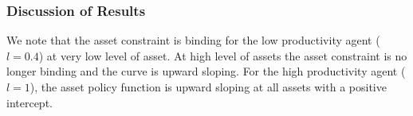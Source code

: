 \documentclass[12pt]{article}
\begin{document}

\subsubsection{Discussion of Results}
We note that the asset constraint is binding for the low productivity agent ($l = 0.4$) at very low level of asset. At high level of assets the asset constraint is no longer binding and the curve is upward sloping. For the high productivity agent ($l = 1$), the asset policy function is upward sloping at all assets with a positive intercept. 

%
\end{document}
